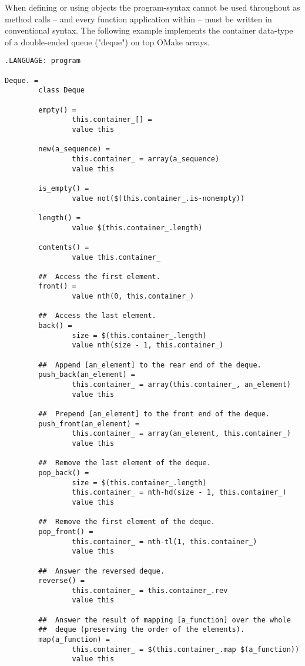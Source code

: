 When defining or using objects the program-syntax cannot be used
throughout as method calls -- and every function application within --
must be written in conventional syntax.  The following example
implements the container data-type of a double-ended queue ("deque")
on top OMake arrays.

\begin{verbatim}
.LANGUAGE: program

Deque. =
        class Deque

        empty() =
                this.container_[] =
                value this

        new(a_sequence) =
                this.container_ = array(a_sequence)
                value this

        is_empty() =
                value not($(this.container_.is-nonempty))

        length() =
                value $(this.container_.length)

        contents() =
                value this.container_

        ##  Access the first element.
        front() =
                value nth(0, this.container_)

        ##  Access the last element.
        back() =
                size = $(this.container_.length)
                value nth(size - 1, this.container_)

        ##  Append [an_element] to the rear end of the deque.
        push_back(an_element) =
                this.container_ = array(this.container_, an_element)
                value this

        ##  Prepend [an_element] to the front end of the deque.
        push_front(an_element) =
                this.container_ = array(an_element, this.container_)
                value this

        ##  Remove the last element of the deque.
        pop_back() =
                size = $(this.container_.length)
                this.container_ = nth-hd(size - 1, this.container_)
                value this

        ##  Remove the first element of the deque.
        pop_front() =
                this.container_ = nth-tl(1, this.container_)
                value this

        ##  Answer the reversed deque.
        reverse() =
                this.container_ = this.container_.rev
                value this

        ##  Answer the result of mapping [a_function] over the whole
        ##  deque (preserving the order of the elements).
        map(a_function) =
                this.container_ = $(this.container_.map $(a_function))
                value this


\end{verbatim}
